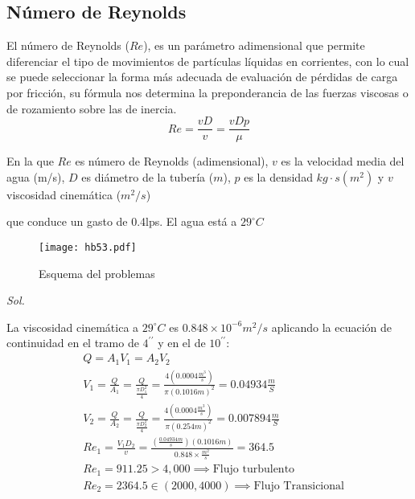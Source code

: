 \subsection{Número de Reynolds}

El número de Reynolds ($Re$), es un parámetro adimensional que permite diferenciar el tipo de movimientos de partículas líquidas en corrientes, con lo cual se puede seleccionar la forma más adecuada de evaluación de pérdidas de carga por fricción, su fórmula nos determina la preponderancia de las fuerzas viscosas o de rozamiento sobre las de inercia.
\begin{equation*}
    Re =\frac{vD}{v} =\frac{vDp}{\mu}
\end{equation*}

En la que  $Re$ es número de Reynolds (adimensional), $v$ es la velocidad media del agua (m/s), $D$ es diámetro de la tubería ($m$), $p$ es la densidad $kg\cdot s(m^2)$ y $v$ viscosidad cinemática ($m^2/s$)

\begin{problem}
    que conduce un gasto de 0.4lps. El agua está a $29^{\circ}C$
\end{problem}
\begin{figure}[h!]
\centering
  \texttt{[image: hb53.pdf]}
  \caption{Esquema del problemas}
  \label{hb53}
\end{figure}

\textit{ Sol. }

La viscosidad cinemática a $29^{\circ}C$ es $0.848\times 10^{-6}m^2/s$ aplicando la ecuación de continuidad en el tramo de $4^{\prime\prime}$ y en el de $10^{\prime\prime}$:
\begin{align*}
    &Q = A_1V_1 = A_2V_2\\
    &V_1 =\frac{Q}{A_1} =\frac{Q}{\frac{\pi D_1^2}{4}} =\frac{4\left( 0.0004\frac{m^3}{s} \right)}{\pi (0.1016m)^2} =0.04934\frac{m}{S}\\
    &V_2 =\frac{Q}{A_2} =\frac{Q}{\frac{\pi D_2^2}{4}} =\frac{4\left( 0.0004\frac{m^3}{s} \right)}{\pi (0.254m)^2} =0.007894\frac{m}{S}\\
    &Re_1 =\frac{V_1D_2}{v} =\frac{(\frac{0.04934m}{s})(0.1016m)}{0.848\times \frac{m^2}{s}} = 364.5\\
    &Re_1 = 911.25 > 4,000\implies \text{Flujo turbulento}\\
    &Re_2 = 2364.5\in (2000,4000)\implies \text{Flujo Transicional}\\
\end{align*}


